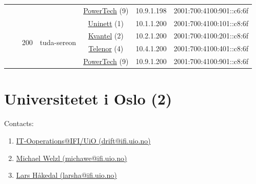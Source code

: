 \begin{small}
\begin{center}
\begin{longtable}{|c|c|c|c|c|c|c|c|}
  &  &  &  & \multicolumn{2}{|c|}{\tiny{\href{http://www.powertech.no}{PowerTech} (9)}} & \tiny{10.9.1.198} & \tiny{2001:700:4100:901::c6:6f} \\* \cline{3-3}\cline{4-4}\cline{5-5}\cline{6-6}\cline{7-7}\cline{8-8}
  &  & \multirow{4}{*}{\tiny{200}} & \multicolumn{1}{|l|}{\multirow{4}{*}{\tiny{tuda-sereon}}} & \multicolumn{2}{|c|}{\tiny{\href{https://www.uninett.no}{Uninett} (1)}} & \tiny{10.1.1.200} & \tiny{2001:700:4100:101::c8:6f} \\* \cline{5-5}\cline{6-6}\cline{7-7}\cline{8-8}
  &  &  &  & \multicolumn{2}{|c|}{\tiny{\href{http://kvantel.no}{Kvantel} (2)}} & \tiny{10.2.1.200} & \tiny{2001:700:4100:201::c8:6f} \\* \cline{5-5}\cline{6-6}\cline{7-7}\cline{8-8}
  &  &  &  & \multicolumn{2}{|c|}{\tiny{\href{https://www.telenor.no}{Telenor} (4)}} & \tiny{10.4.1.200} & \tiny{2001:700:4100:401::c8:6f} \\* \cline{5-5}\cline{6-6}\cline{7-7}\cline{8-8}
  &  &  &  & \multicolumn{2}{|c|}{\tiny{\href{http://www.powertech.no}{PowerTech} (9)}} & \tiny{10.9.1.200} & \tiny{2001:700:4100:901::c8:6f} \\ \hline
\end{longtable}
\end{center}
\end{small}



\section{Universitetet i Oslo (2)}
\label{sec:UiO}

Contacts:\begin{enumerate}
 \item {}\href{mailto:drift@ifi.uio.no}{IT-Ooperations@IFI/UiO (drift@ifi.uio.no)}
 \item {}\href{mailto:michawe@ifi.uio.no}{Michael Welzl (michawe@ifi.uio.no)}
 \item {}\href{mailto:larsha@ifi.uio.no}{Lars Håkedal (larsha@ifi.uio.no)}
\end{enumerate}

